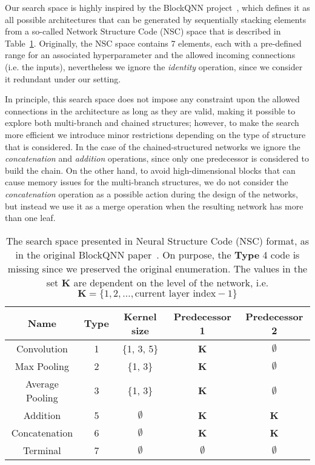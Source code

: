 Our search space is highly inspired by the BlockQNN project~\citep{BlockQNN}, which defines it as all possible architectures that can be generated by sequentially stacking elements from a so-called Network Structure Code (NSC) space that is described in Table~\ref{tab:nas:nsc}. Originally, the NSC space contains 7 elements, each with a pre-defined range for an associated hyperparameter and the allowed incoming connections (i.e. the inputs), nevertheless we ignore the \textit{identity} operation, since we consider it redundant under our setting.

In principle, this search space does not impose any constraint upon the allowed connections in the architecture as long as they are valid, making it possible to explore both multi-branch and chained structures; however, to make the search more efficient we introduce minor restrictions depending on the type of structure that is considered. In the case of the chained-structured networks we ignore the \textit{concatenation} and \textit{addition} operations, since only one predecessor is considered to build the chain. On the other hand, to avoid high-dimensional blocks that can cause memory issues for the multi-branch structures, we do not consider the \textit{concatenation} operation as a possible action during the design of the networks, but instead we use it as a merge operation when the resulting network has more than one leaf.


\begin{table}[ht]
\centering
\begin{tabular}{@{}ccccc@{}}
\toprule
\textbf{Name}   & \textbf{Type} & \textbf{Kernel size} & \textbf{Predecessor 1} & \textbf{Predecessor 2} \\ \midrule
Convolution     & 1             & \{1, 3, 5\}          & \textbf{K}             & $\emptyset$            \\
Max Pooling     & 2             & \{1, 3\}             & \textbf{K}             & $\emptyset$            \\
Average Pooling & 3             & \{1, 3\}             & \textbf{K}             & $\emptyset$            \\
Addition        & 5             & $\emptyset$          & \textbf{K}             & \textbf{K}             \\
Concatenation   & 6             & $\emptyset$          & \textbf{K}             & \textbf{K}             \\
Terminal        & 7             & $\emptyset$          & $\emptyset$            & $\emptyset$            \\ \bottomrule
\end{tabular}
\caption{The search space presented in Neural Structure Code (NSC) format, as in the original BlockQNN paper~\citep{BlockQNN}. On purpose, the \textbf{Type} 4 code is missing since we preserved the original enumeration. The values in the set \textbf{K} are dependent on the level of the network, i.e. $\textbf{K} = \{1, 2, \dots , \text{current layer index} - 1 \}$ }
\label{tab:nas:nsc}
\end{table}

